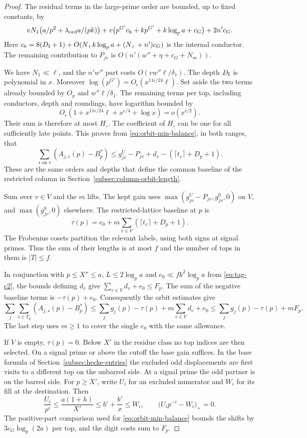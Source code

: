 \begin{proof}
The residual terms in the large-prime order are bounded, up to fixed
constants, by
\[
 vN_1\big(a/p^2+\lambda_{\rm ord} a/(pk)\big)
  +v\big(p^{G'}c_6+kp^{G'}+k\log_p a+c_G\big)+2n'c_G .
\]
Here \(c_6=8(D_{\rm I}+1)+O(N_+k\log_p a+(N_++n')c_G)\)
is the internal conductor. The remaining contribution to \(P_{jv}\) is
\(O(n'(w''+\eta+c_G+N_m))\).

We have \(N_1\ll\ell\), and the \(n'w''\) part costs
\(O(vw''\ell/\delta_1)\).
The depth \(D_{\rm I}\) is polynomial in \(x\). Moreover
\(\log(p^{G'})=O_\epsilon(x^{11\epsilon/24}\ell)\).
Set aside the two terms already bounded by \(O_p\) and \(w''\ell/\delta_1\). The remaining terms per top, including conductors, depth and roundings, have logarithm bounded by
\[
 O_\epsilon\!\left(1+x^{11\epsilon/24}\ell+x^{\epsilon/4}+\log x\right)=o(x^{\epsilon/2}).
\] Their sum is therefore at most \(H_\circ\).
The coefficient of \(H_\circ\) can be one for all sufficiently late
points. This proves from \eqref{eq:orbit-min-balance}, in both
ranges, that
\[
 \sum_{s\text{ on }v}(A_{j,s}(p)-B_p^*)\le
     g^U_{jv}-P_{jv}+d_v-(\lceil t_v\rceil+D_p+1).
\]
These are the same orders and depths that define the common baseline
of the restricted column in Section~\ref{subsec:column-orbit-length}.

Sum over \(v\in V\) and the \(m\) lifts. The kept gain uses
\(\max(g^U_{jv}-P_{jv},g^0_{jv},0)\) on \(V\), and
\(\max(g^0_{jv},0)\) elsewhere. The restricted-lattice baseline at \(p\) is
\[
 \tau(p)=e_0+m\sum_{v\in V}(\lceil t_v\rceil+D_p+1).
\] The Frobenius cosets partition the relevant labels, using both
signs at signal primes. Thus the sum of their lengths is at
most \(f\) and the number of tops in them is \(|T|\le f\).

In conjunction with \(p\le X''\le a\), \(L\le2\log_p a\)
and \(e_0\ll fk^2\log_p a\) from \eqref{eq:tag-c2}, the bounds defining
\(d_v\) give \(\sum_{v\in V}d_v+e_0\le F_p\).
The sum of the negative baseline terms is
\(-\tau(p)+e_0\). Consequently the orbit estimates give
\[
 \sum_j\sum_{s\in T_p}(A_{j,s}(p)-B_p^*)\le
  \sum_j g_j(p)-\tau(p)+m\sum_{v\in V}d_v+e_0
  \le \sum_j g_j(p)-\tau(p)+mF_p .
\]
The last step uses \(m\ge1\) to cover the single \(e_0\)
with the same allowance.

If \(V\) is empty, \(\tau(p)=0\). Below \(X'\) in the residue
class no top indices are then selected. On a signal prime or above the
cutoff the base gain suffices. In the base formula of
Section~\ref{subsec:hecke-entries} the excluded odd displacements
are first visits to a different top on the unbarred side.
At a signal prime the odd partner is on the barred side. For \(p\ge X'\), write \(U_i\) for an excluded numerator
and \(W_i\) for its fill at the destination. Then
\[
 \frac{U_i}{p^i}\le\frac{a(1+h)}{X'}
       \le b'+\frac{b'}{x}\le W_i,
 \qquad \bigl(U_i p^{-i}-W_i\bigr)_+=0 .
\]
The positive-part comparison used for \eqref{eq:orbit-min-balance}
bounds the shifts by \(3c_G\log_p(2a)\) per top, and the digit
costs sum to \(F_p\).


\end{proof}
